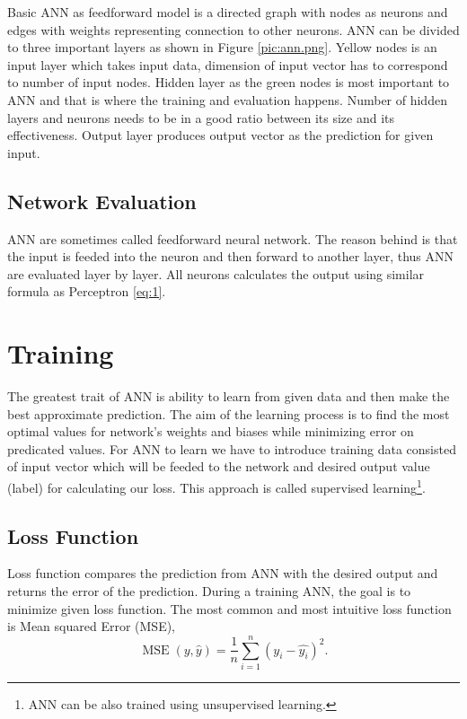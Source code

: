 Basic ANN as feedforward model is a directed graph with nodes as neurons and edges with weights representing connection to other neurons.
ANN can be divided to three important layers as shown in Figure \ref{pic:ann.png}.
Yellow nodes is an input layer which takes input data, dimension of input vector has to correspond to number of input nodes.
Hidden layer as the green nodes is most important to ANN and that is where the training and evaluation happens.
Number of hidden layers and neurons needs to be in a good ratio between its size and its effectiveness.
Output layer produces output vector as the prediction for given input.


\subsection{Network Evaluation}

ANN are sometimes called feedforward neural network.
The reason behind is that the input is feeded into the neuron and then forward to another layer, thus ANN are evaluated layer by layer.
All neurons calculates the output using similar formula as Perceptron \ref{eq:1}.

\section{Training}

The greatest trait of ANN is ability to learn from given data and then make the best approximate prediction.
The aim of the learning process is to find the most optimal values for network's weights and biases while minimizing error on predicated values.
For ANN to learn we have to introduce training data consisted of input vector which will be feeded to the network and desired output value (label) for calculating our loss.
This approach is called supervised learning\footnote{\label{note1}ANN can be also trained using unsupervised learning.}.
\newline

\subsection{Loss Function}

Loss function compares the prediction from ANN with the desired output and returns the error of the prediction.
During a training ANN, the goal is to minimize given loss function.
The most common and most intuitive loss function is Mean squared Error (MSE),
\[ \operatorname{MSE}(y, \hat{y}) = \frac{1}{n}\sum_{i=1}^n(y_i-\hat{y_i})^2. \]


